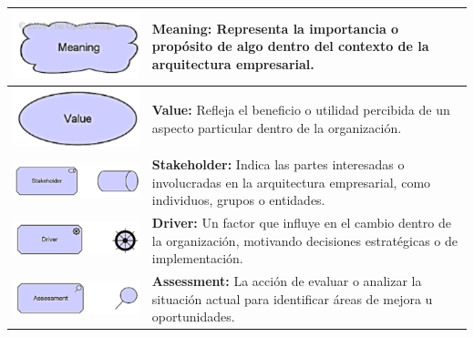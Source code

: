 \begin{longtable}{|c|p{8cm}|}
\endlastfoot
\includegraphics{anexos/ARCHI/strategy/meaning.png} & 
\textbf{Meaning:} Representa la importancia o propósito de algo dentro del contexto de la arquitectura empresarial. \\
\hline
\includegraphics{anexos/ARCHI/strategy/value.png} & 
\textbf{Value:} Refleja el beneficio o utilidad percibida de un aspecto particular dentro de la organización. \\
\hline
\includegraphics{anexos/ARCHI/strategy/stakeholder.png} & 
\textbf{Stakeholder:} Indica las partes interesadas o involucradas en la arquitectura empresarial, como individuos, grupos o entidades. \\
\hline
\includegraphics{anexos/ARCHI/strategy/driver.png} & 
\textbf{Driver:} Un factor que influye en el cambio dentro de la organización, motivando decisiones estratégicas o de implementación. \\
\hline
\includegraphics{anexos/ARCHI/strategy/assessment.png} & 
\textbf{Assessment:} La acción de evaluar o analizar la situación actual para identificar áreas de mejora u oportunidades. \\

\end{longtable}
